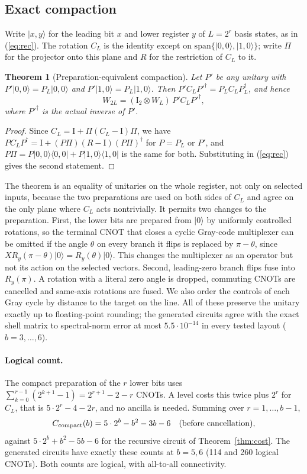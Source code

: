 \documentclass[11pt]{article}
\newtheorem{theorem}{Theorem}
\newcommand{\ket}[1]{\lvert #1\rangle}
\newcommand{\bra}[1]{\langle #1\rvert}
\newcommand{\id}{\mathrm{I}}
\begin{document}
\subsection{Exact compaction}
Write $\ket{x,y}$ for the leading bit $x$ and lower register $y$ of $L=2^r$ basis states, as in (\ref{eq:rec}). The rotation $C_L$ is the identity except on $\mathrm{span}\{\ket{0,0},\ket{1,0}\}$; write $\Pi$ for the projector onto this plane and $R$ for the restriction of $C_L$ to it.
\begin{theorem}[Preparation-equivalent compaction]\label{thm:compact}
Let $P'$ be any unitary with $P'\ket{0,0}=P_L\ket{0,0}$ and $P'\ket{1,0}=P_L\ket{1,0}$. Then $P'C_LP'^\dagger=P_LC_LP_L^\dagger$, and hence
\begin{equation}
 W_{2L}=(\id_2\otimes W_L)\,P'C_LP'^\dagger,
\end{equation}
where $P'^\dagger$ is the actual inverse of $P'$.
\end{theorem}
\begin{proof}
Since $C_L=\id+\Pi(C_L-\id)\Pi$, we have $PC_LP^\dagger=\id+(P\Pi)(R-\id)(P\Pi)^\dagger$ for $P=P_L$ or $P'$, and $P\Pi=P\ket{0,0}\bra{0,0}+P\ket{1,0}\bra{1,0}$ is the same for both. Substituting in (\ref{eq:rec}) gives the second statement.
\end{proof}
The theorem is an equality of unitaries on the whole register, not only on selected inputs, because the two preparations are used on both sides of $C_L$ and agree on the only plane where $C_L$ acts nontrivially. It permits two changes to the preparation. First, the lower bits are prepared from $\ket0$ by uniformly controlled rotations, so the terminal CNOT that closes a cyclic Gray-code multiplexer can be omitted if the angle $\theta$ on every branch it flips is replaced by $\pi-\theta$, since $XR_y(\pi-\theta)\ket0=R_y(\theta)\ket0$. This changes the multiplexer as an operator but not its action on the selected vectors. Second, leading-zero branch flips fuse into $R_y(\pi)$. A rotation with a literal zero angle is dropped, commuting CNOTs are cancelled and same-axis rotations are fused. We also order the controls of each Gray cycle by distance to the target on the line. All of these preserve the unitary exactly up to floating-point rounding; the generated circuits agree with the exact shell matrix to spectral-norm error at most $5.5\cdot10^{-14}$ in every tested layout ($b=3,\dots,6$).

\paragraph{Logical count.} The compact preparation of the $r$ lower bits uses $\sum_{k=0}^{r-1}(2^{k+1}-1)=2^{r+1}-2-r$ CNOTs. A level costs this twice plus $2^r$ for $C_L$, that is $5\cdot2^r-4-2r$, and no ancilla is needed. Summing over $r=1,\dots,b-1$,
\begin{equation}\label{eq:compact-count}
 C_{\rm compact}(b)=5\cdot2^b-b^2-3b-6\quad(\text{before cancellation}),
\end{equation}
against $5\cdot2^b+b^2-5b-6$ for the recursive circuit of Theorem~\ref{thm:cost}. The generated circuits have exactly these counts at $b=5,6$ (114 and 260 logical CNOTs). Both counts are logical, with all-to-all connectivity.
\end{document}
